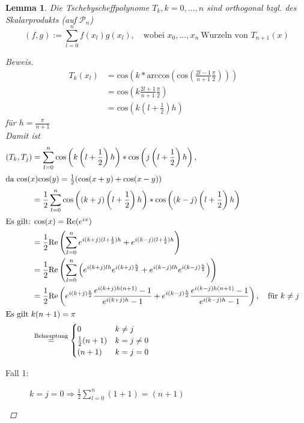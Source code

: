 \documentclass[12pt]{article}
\theoremstyle{break}
\newtheorem{lemma}[theorem]{Lemma}
\begin{document}
\begin{lemma}
Die Tschebyscheffpolynome $T_k, k = 0, ..., n$ sind orthogonal bzgl. des Skalarprodukts (auf $\mathcal{P}_n$)
\[(f, g) := \sum_{l=0}^n f(x_l)g(x_l), \quad \text{wobei } x_0, ..., x_n \medspace \text{Wurzeln von } T_{n+1}(x) \]

\begin{proof}[Beweis]\leavevmode
\begin{align*}
T_k(x_l) &= \text{cos}\left(k *\text{arccos}\left( \text{cos} \left( \frac{2l-1}{n+1} \frac{\pi}{2}\right)\right)\right) &\\
&= \text{cos}\left( k \frac{2l+1}{n+1} \frac{\pi}{2}\right) &\\
&= \text{cos}\left(k \left(l+ \frac{1}{2}\right)h \right)
\end{align*}
für $h = \frac{\pi}{n+1}$\\
Damit ist 
\begin{align*}
(T_k, T_j) &= \sum_{l=0}^n \text{cos}\left(k\left(l+\frac{1}{2}\right)h\right) * \text{cos}\left(j\left(l+\frac{1}{2}\right)h\right), &\\
\intertext{da $\text{cos}(x)\text{cos}(y) = \frac{1}{2}(\text{cos}(x+y) + \text{cos}(x-y))$}
&= \frac{1}{2} \sum_{l=0}^n \text{cos}\left(\left(k+j\right)\left(l+\frac{1}{2}\right)h\right) * \text{cos}\left((k-j)\left(l+\frac{1}{2}\right)h\right) &\\
\intertext{Es gilt: $\text{cos}(x) = \text{Re} (e^{ix})$}
&= \frac{1}{2} \text{Re}\left( \sum_{l=0}^n e^{i(k+j)(l+\frac{1}{2})h} + e^{i(k-j)(l+\frac{1}{2})h}\right) &\\
&= \frac{1}{2} \text{Re}\left( \sum_{l=0}^n \left( e^{i(k+j)lh}e^{i(k+j)\frac{h}{2}} + e^{i(k-j)lh}e^{i(k-j)\frac{h}{2}}\right)\right) &\\
&= \frac{1}{2} \text{Re} \left( e^{i(k+j)\frac{h}{2}} \frac{e^{i(k+j)h(n+1)} -1}{ e^{i(k+j)h} - 1} + e^{i(k-j)\frac{h}{2}} \frac{e^{i(k-j)h(n+1)} -1}{ e^{i(k-j)h} - 1}\right), \quad \text{für }k \neq j &\\
\intertext{Es gilt $k(n+1) = \pi$}
&\overset{\text{Behauptung}}{=} \begin{cases}
0 & k \neq j \\
\frac{1}{2} (n+1) & k=j\neq 0 \\
(n+1) & k = j = 0
\end{cases}
\end{align*}
\begin{description}
  \item[Fall 1:] $k=j=0 \Rightarrow \frac{1}{2} \sum_{l=0}^n(1+1) = (n+1)$

\end{description}
\end{proof}
\end{lemma}
\end{document}
